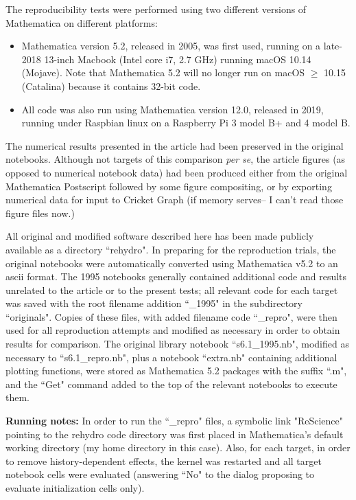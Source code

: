  The reproducibility tests were performed using two different versions of Mathematica on different platforms:

\begin{itemize}

\item Mathematica version 5.2, released in 2005, was first used, running on a late-2018 13-inch Macbook (Intel core i7, 2.7 GHz) running macOS 10.14 (Mojave). Note that Mathematica 5.2 will no longer run on macOS $\ge$ 10.15 (Catalina) because it contains 32-bit code.

\item All code was also run using Mathematica version 12.0, released in 2019, running under Raspbian linux on a Raspberry Pi 3 model B+ and 4 model B.

\end{itemize}

The numerical results presented in the article had been preserved in the original notebooks. Although not targets of this comparison \textit{per se}, the article figures (as opposed to numerical notebook data) had been produced either from the original Mathematica Postscript followed by some figure compositing, or by exporting numerical data for input to Cricket Graph (if memory serves-- I can't read those figure files now.)

All original and modified software described here has been made publicly available as a directory ``rehydro". In preparing for the reproduction trials, the original notebooks were automatically converted using Mathematica v5.2 to an ascii format. The 1995 notebooks generally contained additional code and results unrelated to the article or to the present tests; all relevant code for each target was saved with the root filename addition ``\_1995" in the subdirectory ``originals". Copies of these files, with added filename code ``\_repro", were then used for all reproduction attempts and modified as necessary in order to obtain results for comparison. The original library notebook ``s6.1\_1995.nb", modified as necessary to ``s6.1\_repro.nb", plus a notebook ``extra.nb" containing additional plotting functions, were stored as Mathematica 5.2 packages with the suffix ``.m", and the ``Get" command added to the top of the relevant notebooks to execute them.

\textbf{Running notes:} In order to run the ``\_repro" files, a symbolic link "ReScience" pointing to the rehydro code directory was first placed in Mathematica's default working directory (my home directory in this case). Also, for each target, in order to remove history-dependent effects, the kernel was restarted and all target notebook cells were evaluated (answering ``No" to the dialog proposing to evaluate initialization cells only).

